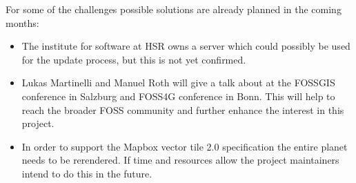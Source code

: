 For some of the challenges possible solutions are already planned in the coming months:

\begin{itemize}
    \item The institute for software at HSR owns a server which could possibly be used for the update process, but this is not yet confirmed.
    \item Lukas Martinelli and Manuel Roth will give a talk about \osmvt{} at the FOSSGIS conference in Salzburg and FOSS4G conference in Bonn. This will help to reach the broader FOSS community and further enhance the interest in this project.
    \item In order to support the Mapbox vector tile 2.0 specification the entire planet needs to be rerendered. If time and resources allow the project maintainers intend to do this in the future.
\end{itemize}
